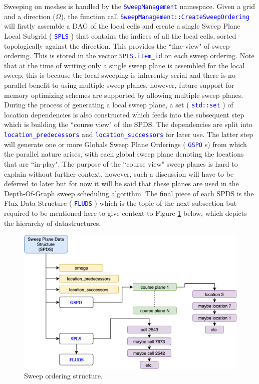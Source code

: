\documentclass[11pt,letterpaper,titlepage]{article}
\newcommand{\xmltag}[1]{\textcolor{blue}{ \texttt{#1}} }
\numberwithin{equation}{section}
\begin{document}
Sweeping on meshes is handled by the \xmltag{SweepManagement} namespace. Given a grid and a direction ($\Omega$), the function call \xmltag{SweepManagement::CreateSweepOrdering} will firstly assemble a DAG of the local cells and create a single Sweep Plane Local Subgrid (\xmltag{SPLS}) that contains the indices of all the local cells, sorted topologically against the direction. This provides the ``fine-view" of sweep ordering. This is stored in the vector \xmltag{SPLS.item\_id} on each sweep ordering. Note that at the time of writing only a single sweep plane is assembled for the local sweep, this is because the local sweeping is inherently serial and there is no parallel benefit to using multiple sweep planes, however, future support for memory optimizing schemes are supported by allowing multiple sweep planes. During the  process of generating a local sweep plane, a set (\xmltag{std::set}) of location dependencies is also constructed which feeds into the subsequent step which is building the ``course view" of the SPDS. The dependencies are split into \xmltag{location\_predecessors} and \xmltag{location\_successors} for later use. The latter step will generate one or more Globals Sweep Plane Orderings (\xmltag{GSPO}s) from which the parallel nature arises, with each global sweep plane denoting the locations that are ``in-play". The purpose of the ``course view" sweep planes is hard to explain without further context, however, such a discussion will have to be deferred to later but for now it will be said that these planes are used in the Depth-Of-Graph sweep scheduling algorithm. The final piece of each SPDS is the Flux Data Structure (\xmltag{FLUDS}) which is the topic of the next subsection but required to be mentioned here to give context to Figure \ref{fig:sweepordering} below, which depicts the hierarchy of datastructures.
\vspace{0.5cm}
\begin{figure}[H]
\centering
\includegraphics[width=0.9\linewidth]{LatexDraw/SweepOrdering}
\caption{Sweep ordering structure.}
\label{fig:sweepordering}
\end{figure}
\end{document}
